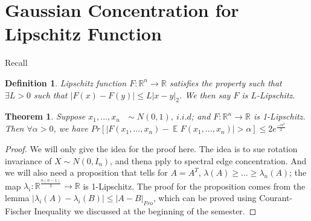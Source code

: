 \documentclass[11pt,letter]{article}
\DeclareMathOperator{\E}{\mathbb{E}}
\newtheorem{definition}{Definition}
\newtheorem{theorem}{Theorem}
\begin{document}
\section{Gaussian Concentration for Lipschitz Function}

Recall 
\begin{definition}
Lipschitz function $F:\mathbb{R}^n \to \mathbb{R}$ satisfies the property such that $\exists L>0$ such that $|F(x)-F(y)|\leq L|x-y|_2$. We then say $F$ is $L$-Lipschitz.
\end{definition}

\begin{theorem}
Suppose $x_1,...,x_n \text{  }\sim N(0,1),\ i.i.d$; and $F:\mathbb{R}^n \to \mathbb{R}$ is 1-Lipschitz. Then $\forall \alpha>0$, we have $Pr[|F(x_1,...,x_n)-\E F(x_1,...,x_n)|>\alpha]\leq 2e^{\frac{-\alpha^2}{2}}$
\end{theorem}

\begin{proof}
We will only give the idea for the proof here. The idea is to sue rotation invariance of $X\sim N(0,I_n)$, and thena pply to spectral edge concentration. And we will also need a proposition that tells for $A=A^T$, $\lambda(A)\geq ...\geq \lambda_n(A)$; the map $\lambda_i: \mathbb{R}^{\frac{n(n-1)}{2}} \to \mathbb{R}$ is 1-Lipschitz. The proof for the proposition comes from the lemma $|\lambda_i(A)-\lambda_i(B)|\leq |A-B|_{Fro}$, which can be proved using Courant-Fischer Inequality we discussed at the beginning of the semester.
\end{proof}
\end{document}
